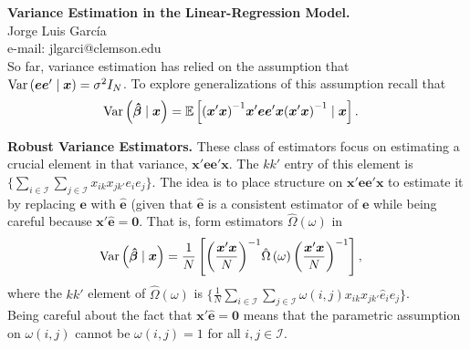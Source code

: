 
\let\counterwithout\relax
\let\counterwithin\relax
{}




\noindent \textbf{Variance Estimation in the Linear-Regression Model.}\\
\noindent Jorge Luis García \\
\noindent e-mail: jlgarci@clemson.edu\\

\noindent So far, variance estimation has relied on the assumption that $ \operatorname{Var} \left( \bm{e} \bm{e}' \mid \bm{x} \right) = \sigma^2 I_N$. To explore generalizations of this assumption recall that 
\begin{align}
	\operatorname{Var} \left( \bm{\hat{\beta}} \mid \bm{x} \right) & = \mathbb{E} \left[ { \left( \bm{x}' \bm{x} \right) }^{-1} \bm{x}' \bm{e} \bm{e}' \bm{x} { \left( \bm{x}' \bm{x} \right) }^{-1} \mid \bm{x} \right]. 
\end{align} 

\noindent \textbf{Robust Variance Estimators.} These class of estimators focus on estimating a crucial element in that variance, $\bm{x}' \bm{e} \bm{e}' \bm{x}$. The  $kk'$ entry of this element is $\{ \sum \limits _{i \in \mathcal{I}} \sum \limits _{j \in \mathcal{I}} x_{ik} x_{jk'} e_i e_j \}$. The idea is to place structure on $\bm{x}' \bm{e} \bm{e}' \bm{x}$ to estimate it by replacing $\bm{e}$ with $\bm{\hat{e}}$ (given that $\bm{\hat{e}}$ is a consistent estimator of $\bm{e}$ while being careful because $\bm{x}' \bm{\hat{e}} = \bm{0}$. That is, form estimators $\hat{\Omega} \left( \omega \right)$ in
\begin{align}
	\operatorname{Var} \left( \bm{\hat{\beta}} \mid \bm{x} \right) & = \frac{1}{N} \left[ { \left(  \frac{\bm{x}' \bm{x} }{N} \right)}^{-1} \hat{\Omega} \left( \omega \right) { \left(  \frac{\bm{x}' \bm{x} }{N} \right)}^{-1} \right], 
\end{align}
\noindent where the $kk'$ element of $\hat{\Omega} \left( \omega \right)$ is $\{ \frac{1}{N} \sum \limits _{i \in \mathcal{I}} \sum \limits _{j \in \mathcal{I}} \omega \left(i , j \right) x_{ik} x_{jk'} \hat{e}_i \hat{e}_j \}$.\\ 

\noindent Being careful about the fact that $\bm{x}' \bm{\hat{e}} = \bm{0}$ means that the parametric assumption on $\omega \left(i , j \right)$ cannot be $\omega \left(i , j \right) = 1$ for all $i,j \in \mathcal{I}$.\\

